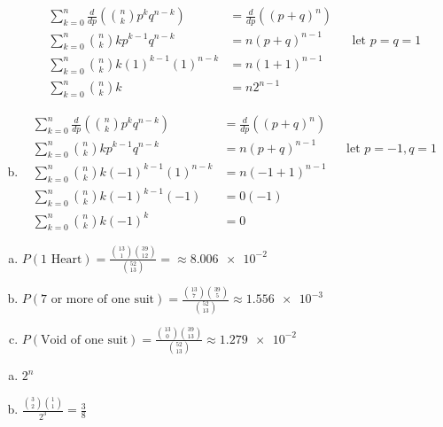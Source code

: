 \documentclass[12pt]{article}
\newenvironment{problem}[2][Problem]{\begin{trivlist}
\item[\hskip \labelsep {\bfseries #1}\hskip \labelsep {\bfseries #2.}]
  \vspace{1 cm}
}{\end{trivlist}}
\begin{document}
\begin{problem}{2.31}
\begin{enumerate}[a.]
\begin{align*}
        \sum_{k=0}^n \frac{d}{dp}\left( \binom{n}{k} p^k q^{n-k}\right) &= \frac{d}{dp}\left((p+q)^n \right) \\
        \sum_{k=0}^n \binom{n}{k}k p^{k-1} q^{n-k} &= n(p+q)^{n-1} & & \textrm{let } p=q=1 \\
        \sum_{k=0}^n \binom{n}{k}k(1)^{k-1}(1)^{n-k} &= n(1+1)^{n-1} \\
        \sum_{k=0}^n \binom{n}{k}k &= n2^{n-1}
      \end{align*}
    \item %
       \begin{align*}
        \sum_{k=0}^n \frac{d}{dp}\left( \binom{n}{k} p^k q^{n-k}\right) &= \frac{d}{dp}\left((p+q)^n \right) \\
        \sum_{k=0}^n \binom{n}{k}k p^{k-1} q^{n-k} &= n(p+q)^{n-1} & & \textrm{let } p=-1, q=1 \\
        \sum_{k=0}^n \binom{n}{k}k(-1)^{k-1}(1)^{n-k} &= n(-1+1)^{n-1} \\
        \sum_{k=0}^n \binom{n}{k}k(-1)^{k-1}(-1) &= 0(-1) \\
        \sum_{k=0}^n \binom{n}{k}k(-1)^{k} &= 0 
      \end{align*}
  \end{enumerate}
\end{problem}

\begin{problem}{2.33}
\item
  \begin{enumerate}[a.]
    \item %
      $P(\textrm{1 Heart}) =  \frac{\binom{13}{1} \binom{39}{12}}{\binom{52}{13}} = \approx \num{8.006e-2}$
    \item %
      $P(\textrm{7 or more of one suit}) 
      =  \frac{\binom{13}{7} \binom{39}{5}}{\binom{52}{13}} \approx \num{1.556e-3}$
    \item %
      $P(\textrm{Void of one suit}) 
      = \frac{\binom{13}{0} \binom{39}{13}}{\binom{52}{13}} \approx \num{1.279e-2}$
  \end{enumerate}
\end{problem}

\begin{problem}{2.35}
\item
  \begin{enumerate}[a.]
    \item %
      $2^n$
    \item %
      $\frac{\binom{3}{2} \binom{1}{1}}{2^3} = \frac{3}{8}$     
  \end{enumerate}
\end{problem}
\end{document}
